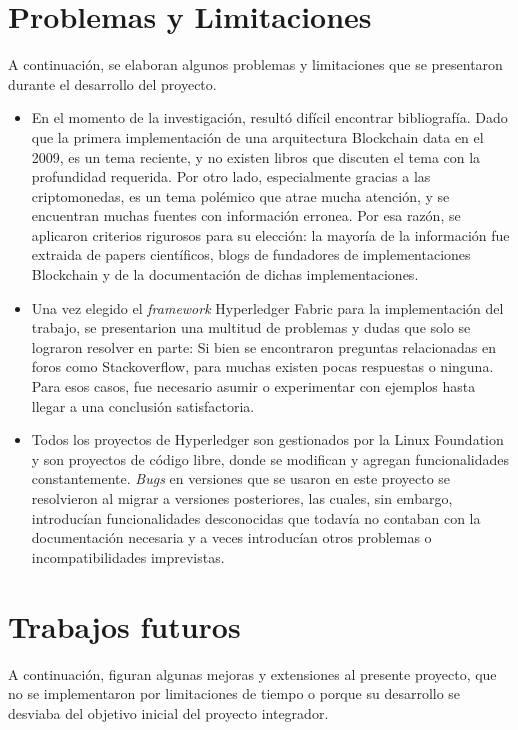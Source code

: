 \section{Problemas y Limitaciones}
A continuación, se elaboran algunos problemas y limitaciones que se presentaron durante el desarrollo del proyecto.

\begin{itemize}
    \item 
    En el momento de la investigación, resultó difícil encontrar bibliografía. Dado que la primera implementación de una arquitectura Blockchain data en el 2009, es un tema reciente, y no existen libros que discuten el tema con la profundidad requerida. Por otro lado, especialmente gracias a las criptomonedas, es un tema polémico que atrae mucha atención, y se encuentran muchas fuentes con información erronea. Por esa razón, se aplicaron criterios rigurosos para su elección: la mayoría de la información fue extraida de papers científicos, blogs de fundadores de implementaciones Blockchain y de la documentación de dichas implementaciones.
    \item Una vez elegido el \textit{framework} Hyperledger Fabric para la implementación del trabajo, se presentarion una multitud de problemas y dudas que solo se lograron resolver en parte: Si bien se encontraron preguntas relacionadas en foros como Stackoverflow, para muchas existen pocas respuestas o ninguna. Para esos casos, fue necesario asumir o experimentar con ejemplos hasta llegar a una conclusión satisfactoria.
    \item Todos los proyectos de Hyperledger son gestionados por la Linux Foundation y son proyectos de código libre, donde se modifican y agregan funcionalidades constantemente. \textit{Bugs} en versiones que se usaron en este proyecto se resolvieron al migrar a versiones posteriores, las cuales, sin embargo, introducían funcionalidades desconocidas que todavía no contaban con la documentación necesaria y a veces introducían otros problemas o incompatibilidades imprevistas.  
\end{itemize}

\section{Trabajos futuros}
A continuación, figuran algunas mejoras y extensiones al presente proyecto, que no se implementaron por limitaciones de tiempo o porque su desarrollo se desviaba del objetivo inicial del proyecto integrador.

